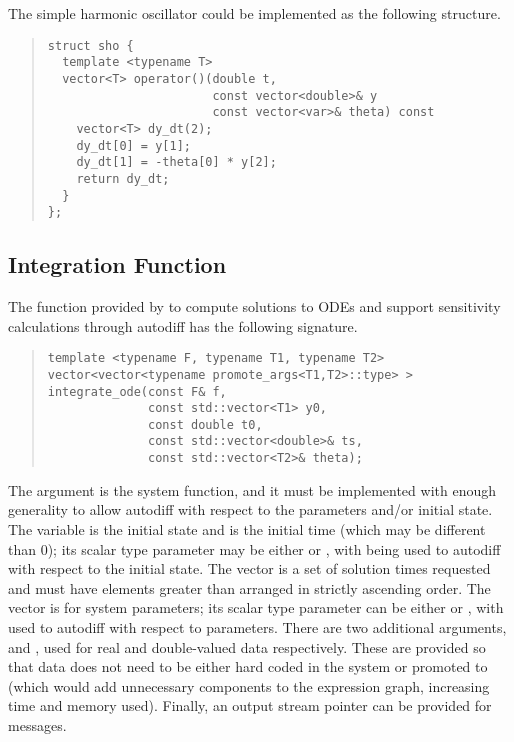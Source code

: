 \documentclass[10pt]{article}
\begin{document}
The simple harmonic oscillator could be implemented as the following
structure.
%
\begin{quote}
\begin{Verbatim}
struct sho {
  template <typename T>
  vector<T> operator()(double t, 
                       const vector<double>& y
                       const vector<var>& theta) const
    vector<T> dy_dt(2);
    dy_dt[0] = y[1];
    dy_dt[1] = -theta[0] * y[2];
    return dy_dt;
  }
};
\end{Verbatim}
\end{quote}


\subsection{Integration Function}

The function provided by  to compute solutions to
ODEs and support sensitivity calculations through autodiff has the
following signature.
%
\begin{quote}
\begin{Verbatim}
template <typename F, typename T1, typename T2>
vector<vector<typename promote_args<T1,T2>::type> >
integrate_ode(const F& f,
              const std::vector<T1> y0,
              const double t0,
              const std::vector<double>& ts,
              const std::vector<T2>& theta);
\end{Verbatim}
\end{quote}
%
The argument  is the system function, and it must be
implemented with enough generality to allow autodiff with respect to
the parameters and/or initial state.  The variable  is the
initial state and  is the initial time (which may be
different than 0); its scalar type parameter  may be either
 or , with  being used to autodiff
with respect to the initial state.  The vector  is a set of
solution times requested and must have elements greater than 
arranged in strictly ascending order.  The vector  is for
system parameters; its scalar type parameter  can be either
 or , with  used to autodiff with
respect to parameters.  There are two additional arguments, 
and , used for real and double-valued data respectively.
These are provided so that data does not need to be either hard coded
in the system or promoted to  (which would add unnecessary
components to the expression graph, increasing time and memory used).
Finally, an output stream pointer can be provided for messages.
\end{document}
